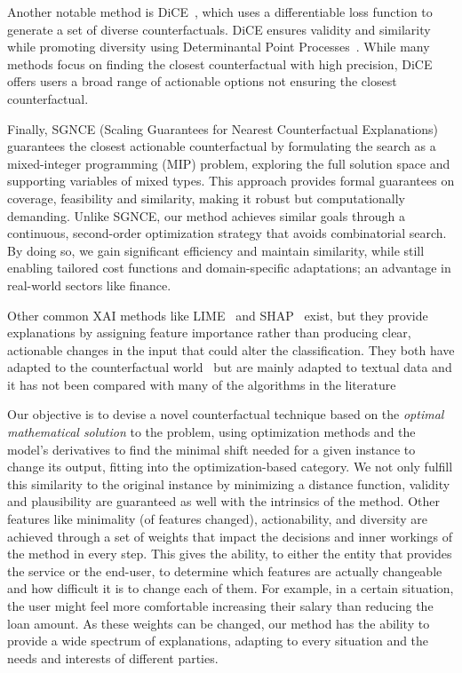 \documentclass[12pt]{extarticle}
\numberwithin{equation}{section}
\begin{document}
Another notable method is DiCE~\cite{dice}, which uses a differentiable loss function to generate a set of diverse counterfactuals. DiCE ensures validity and similarity while promoting diversity using Determinantal Point Processes~\cite{borodin2009}. While many methods focus on finding the closest counterfactual with high precision, DiCE offers users a broad range of actionable options not ensuring the closest counterfactual. 

Finally, SGNCE (Scaling Guarantees for Nearest Counterfactual Explanations)~\cite{sgnce} guarantees the closest actionable counterfactual by formulating the search as a mixed-integer programming (MIP) problem, exploring the full solution space and supporting variables of mixed types. This approach provides formal guarantees on coverage, feasibility and similarity, making it robust but computationally demanding. Unlike SGNCE, our method achieves similar goals through a continuous, second-order optimization strategy that avoids combinatorial search. By doing so, we gain significant efficiency and maintain similarity, while still enabling tailored cost functions and domain-specific adaptations; an advantage in real-world sectors like finance.

Other common XAI methods like LIME~\cite{lime} and SHAP~\cite{shap} exist, but they provide explanations by assigning feature importance rather than producing clear, actionable changes in the input that could alter the classification. They both have adapted to the counterfactual world~\cite{limecshapc} but are mainly adapted to textual data and it has not been compared with many of the algorithms in the literature~\cite{guidotti2024counterfactual}

Our objective is to devise a novel counterfactual technique based on the \emph{optimal mathematical solution} to the problem, using optimization methods and the model's derivatives to find the minimal shift needed for a given instance to change its output, fitting into the optimization-based category. We not only fulfill this similarity to the original instance by minimizing a distance function, validity and plausibility are guaranteed as well with the intrinsics of the method. Other features like minimality (of features changed), actionability, and diversity are achieved through a set of weights that impact the decisions and inner workings of the method in every step. This gives the ability, to either the entity that provides the service or the end-user, to determine which features are actually changeable and how difficult it is to change each of them. For example, in a certain situation, the user might feel more comfortable increasing their salary than reducing the loan amount. As these weights can be changed, our method has the ability to provide a wide spectrum of explanations, adapting to every situation and the needs and interests of different parties.
\end{document}
